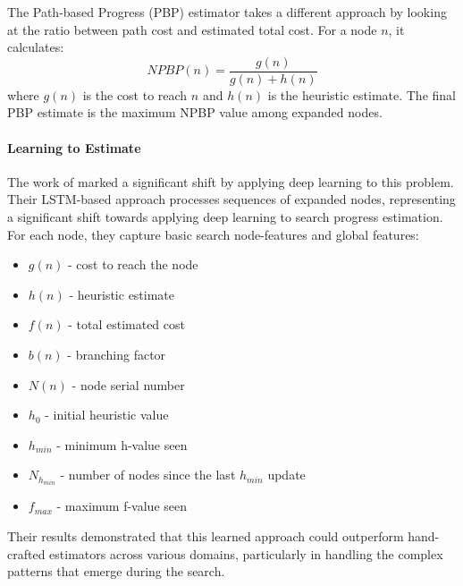\documentclass[letterpaper]{article}
\begin{document}
The Path-based Progress (PBP) estimator takes a different approach by looking at the ratio between path cost and estimated total cost. For a node $n$, it calculates:
\begin{equation}
    NPBP(n) = \frac{g(n)}{g(n) + h(n)}
\end{equation}
where $g(n)$ is the cost to reach $n$ and $h(n)$ is the heuristic estimate. The final PBP estimate is the maximum NPBP value among expanded nodes.

\paragraph{Learning to Estimate}\label{para:learning-to-estimate}
The work of \citet{sudry2022learning} marked a significant shift by applying deep learning to this problem. Their LSTM-based approach processes sequences of expanded nodes, representing a significant shift towards applying deep learning to search progress estimation. For each node, they capture basic search node-features and global features:

\begin{itemize}
    \item $g(n)$ - cost to reach the node
    \item $h(n)$ - heuristic estimate
    \item $f(n)$ - total estimated cost
    \item $b(n)$ - branching factor
    \item $N(n)$ - node serial number
    \item $h_0$ - initial heuristic value
    \item $h_{min}$ - minimum h-value seen
    \item $N_{h_{min}}$ - number of nodes since the last $h_{min}$ update
    \item $f_{max}$ - maximum f-value seen
\end{itemize}

Their results demonstrated that this learned approach could outperform hand-crafted estimators across various domains, particularly in handling the complex patterns that emerge during the search.
\end{document}
